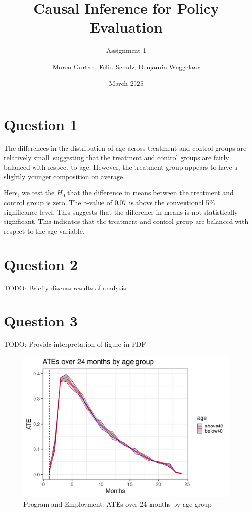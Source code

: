 \documentclass{scrartcl}
\title{Causal Inference for Policy Evaluation}
\subtitle{Assignment 1}
\author{Marco Gortan, Felix Schulz, Benjamin Weggelaar}
\date{March 2025}
\begin{document}
\maketitle

\section*{Question 1}



The differences in the distribution of age across treatment and control groups are relatively small, suggesting that the treatment and control groups are fairly balanced with respect to age. However, the treatment group appears to have a slightly younger composition on average.



Here, we test the $H_0$ that the difference in means between the treatment and control group is zero. The p-value of 0.07 is above the conventional 5\% significance level. This suggests that the difference in means is not statistically significant. This indicates that the treatment and control group are balanced with respect to the age variable.

\section*{Question 2}

TODO: Briefly discuss results of analysis

\section*{Question 3}

TODO: Provide interpretation of figure in PDF

\begin{figure}
    \centering
    \includegraphics[width=0.7\linewidth]{output/figures/ATEs_over_24_months_by_age_group.png}
    \caption{Program and Employment: ATEs over 24 months by age group}
    \label{fig:enter-label}
\end{figure}
\end{document}
